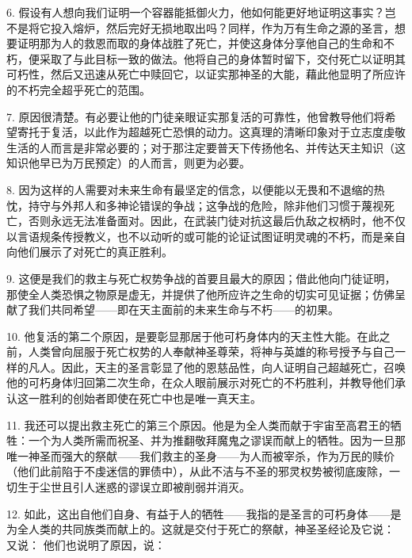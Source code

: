 6. 假设有人想向我们证明一个容器能抵御火力，他如何能更好地证明这事实？岂不是将它投入熔炉，然后完好无损地取出吗？同样，作为万有生命之源的圣言，想要证明那为人的救恩而取的身体战胜了死亡，并使这身体分享他自己的生命和不朽，便采取了与此目标一致的做法。他将自己的身体暂时留下，交付死亡以证明其可朽性，然后又迅速从死亡中赎回它，以证实那神圣的大能，藉此他显明了所应许的不朽完全超乎死亡的范围。\par

7. 原因很清楚。有必要让他的门徒亲眼证实那复活的可靠性，他曾教导他们将希望寄托于复活，以此作为超越死亡恐惧的动力。这真理的清晰印象对于立志度虔敬生活的人而言是非常必要的；对于那注定要普天下传扬他名、并传达天主知识（这知识他早已为万民预定）的人而言，则更为必要。\par

8. 因为这样的人需要对未来生命有最坚定的信念，以便能以无畏和不退缩的热忱，持守与外邦人和多神论错误的争战；这争战的危险，除非他们习惯于蔑视死亡，否则永远无法准备面对。因此，在武装门徒对抗这最后仇敌之权柄时，他不仅以言语规条传授教义，也不以动听的或可能的论证试图证明灵魂的不朽，而是亲自向他们展示了对死亡的真正胜利。\par

9. 这便是我们的救主与死亡权势争战的首要且最大的原因；借此他向门徒证明，那使全人类恐惧之物原是虚无，并提供了他所应许之生命的切实可见证据；仿佛呈献了我们共同希望——即在天主面前的未来生命与不朽——的初果。\par

10. 他复活的第二个原因，是要彰显那居于他可朽身体内的天主性大能。在此之前，人类曾向屈服于死亡权势的人奉献神圣尊荣，将神与英雄的称号授予与自己一样的凡人。因此，天主的圣言彰显了他的恩慈品性，向人证明自己超越死亡，召唤他的可朽身体归回第二次生命，在众人眼前展示对死亡的不朽胜利，并教导他们承认这一胜利的创始者即使在死亡中也是唯一真天主。\par

11. 我还可以提出救主死亡的第三个原因。他是为全人类而献于宇宙至高君王的牺牲：一个为人类所需而祝圣、并为推翻敬拜魔鬼之谬误而献上的牺牲。因为一旦那唯一神圣而强大的祭献——我们救主的圣身——为人而被宰杀，作为万民的赎价（他们此前陷于不虔迷信的罪债中），从此不洁与不圣的邪灵权势被彻底废除，一切生于尘世且引人迷惑的谬误立即被削弱并消灭。\par

12. 如此，这出自他们自身、有益于人的牺牲——我指的是圣言的可朽身体——是为全人类的共同族类而献上的。这就是交付于死亡的祭献，神圣圣经论及它说： 又说： 他们也说明了原因，说：\par

